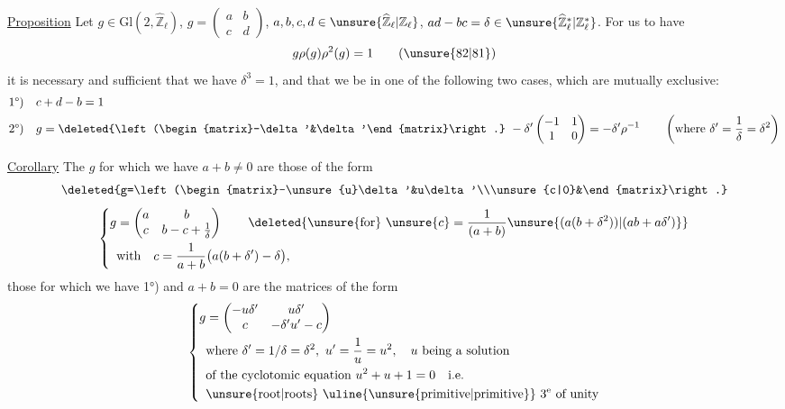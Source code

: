 
\uline{Proposition} Let $g\in\mathrm{Gl}(2,\widehat{\mathbb Z}_\ell)$, $g=\begin{pmatrix}a&b\\c&d\end{pmatrix}$, $a,b,c,d\in\unsure{\widehat{\mathbb Z}_\ell|\mathbb Z_\ell}$,
$ad-bc=\delta\in\unsure{\widehat{\mathbb Z}_\ell^{*}|\mathbb Z_\ell^{*}}$. For us to have
\[
g\rho(g)\rho^2(g)=1\qquad(\unsure{82|81})
\]
it is necessary and sufficient that we have $\delta^3=1$, and that we be in one of the following two cases, which are mutually exclusive:
\[
\begin{aligned}
1\text{°)}\quad&c+d-b=1\\
2\text{°)}\quad&g=\deleted{\left(\begin{matrix}-\delta'&\delta'\end{matrix}\right.}\ -\delta'\begin{pmatrix}-1&1\\1&0\end{pmatrix}=-\delta'\rho^{-1}\qquad\left(\text{where }\delta'=\frac1\delta=\delta^2\right)
\end{aligned}
\]


\uline{Corollary} The $g$ for which we have   $a+b\ne0$ are those of the form
\[
\deleted{g=\left(\begin{matrix}-\unsure{u}\delta'&u\delta'\\\unsure{c|0}&\end{matrix}\right.}
\]
\[
\left\{\begin{aligned}
g&=\begin{pmatrix}a&b\\c&b-c+\frac1\delta\end{pmatrix}\qquad\deleted{\unsure{\text{for}}\ \unsure{c}=\frac1{(a+b)}\unsure{(a(b+\delta^2))|(ab+a\delta')}}\\
&\text{with}\quad c=\frac1{a+b}\bigl(a(b+\delta')-\delta\bigr),
\end{aligned}\right.
\]
those for which we have 1°) and $a+b=0$ are  the matrices of the form
\[
\left\{\begin{aligned}
g&=\begin{pmatrix}-u\delta'&u\delta'\\c&-\delta'u'-c\end{pmatrix}\\
&\text{where }\delta'=1/\delta=\delta^2,\ u'=\frac1u=u^2,\quad u\text{ being a solution}\\
&\text{of the cyclotomic equation }u^2+u+1=0\quad\text{i.e.}\\
&\text{\unsure{root|roots} \uline{\unsure{primitive|primitive}} }3^{\mathrm e}\text{ of unity}
\end{aligned}\right.
\]